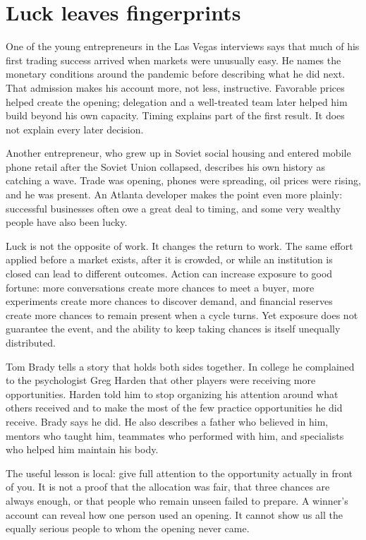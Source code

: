 \section{Luck leaves fingerprints}

One of the young entrepreneurs in the Las Vegas interviews says that much of
his first trading success arrived when markets were unusually easy. He names
the monetary conditions around the pandemic before describing what he did next.
That admission makes his account more, not less, instructive. Favorable prices
helped create the opening; delegation and a well-treated team later helped him
build beyond his own capacity. Timing explains part of the first result. It
does not explain every later decision.

Another entrepreneur, who grew up in Soviet social housing and entered mobile
phone retail after the Soviet Union collapsed, describes his own history as
catching a wave. Trade was opening, phones were spreading, oil prices were
rising, and he was present. An Atlanta developer makes the point even more
plainly: successful businesses often owe a great deal to timing, and some very
wealthy people have also been lucky.

Luck is not the opposite of work. It changes the return to work. The same
effort applied before a market exists, after it is crowded, or while an
institution is closed can lead to different outcomes. Action can increase
exposure to good fortune: more conversations create more chances to meet a
buyer, more experiments create more chances to discover demand, and financial
reserves create more chances to remain present when a cycle turns. Yet exposure
does not guarantee the event, and the ability to keep taking chances is itself
unequally distributed.

Tom Brady tells a story that holds both sides together. In college he
complained to the psychologist Greg Harden that other players were receiving
more opportunities. Harden told him to stop organizing his attention around
what others received and to make the most of the few practice opportunities he
did receive. Brady says he did. He also describes a father who believed in him,
mentors who taught him, teammates who performed with him, and specialists who
helped him maintain his body.

The useful lesson is local: give full attention to the opportunity actually in
front of you. It is not a proof that the allocation was fair, that three chances
are always enough, or that people who remain unseen failed to prepare. A
winner's account can reveal how one person used an opening. It cannot show us
all the equally serious people to whom the opening never came.

